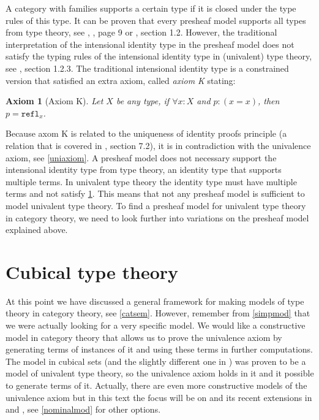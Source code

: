 \documentclass[12pt,a4paper,twoside,xetex]{book}
\newcommand{\keyword}[1]{\emph{#1}\index{#1}}
\newtheorem{axiom}[theorem]{Axiom}
\newcommand{\op}[1]{\mathtt{#1}}
\begin{document}
A category with families supports a certain type if it is closed under the type rules of this type.  It can be proven that every presheaf model supports all types from type theory, see \cite{Hofmann1997}, \cite{Nuyts2018}, page 9 or \cite{Huber2016}, section 1.2. However, the traditional interpretation of the intensional identity type in the presheaf model does not satisfy the typing rules of the intensional identity type in (univalent) type theory, see \cite{Huber2016}, section 1.2.3. The traditional intensional identity type is a constrained version that satisfied an extra axiom, called \keyword{axiom K} stating: 

\begin{axiom}[Axiom K]\label{axiomk}
Let $X$ be any type, if $\forall x : X$ and $p : (x = x)$, then $p = \op{refl}_x$.  
\end{axiom}

Because axom K is related to the uniqueness of identity proofs principle (a relation that is covered in \cite{Voevodsky2013}, section 7.2), it is in contradiction with the univalence axiom, see \cref{uniaxiom}. A presheaf model does not necessary support the intensional identity type from type theory, an identity type that supports multiple terms. In univalent type theory the identity type must have multiple terms and not satisfy \cref{axiomk}. This means that not any presheaf model is sufficient to model univalent type theory. To find a presheaf model for univalent type theory in category theory, we need to look further into variations on the presheaf model explained above.  

\chapter{Cubical type theory}\label{cubical}

At this point we have discussed a general framework for making models of type theory in category theory, see \cref{catsem}. However, remember from \cref{simpmod} that we were actually looking for a very specific model. We would like a constructive model in category theory that allows us to prove the univalence axiom by generating terms of instances of it and using these terms in further computations. The model in cubical sets \cite{Bezem2014} (and the slightly different one in \cite{Cohen2016}) was proven to be a model of univalent type theory, so the univalence axiom holds in it and it possible to generate terms of it. Actually, there are even more constructive models of the univalence axiom but in this text the focus will be on \cite{Cohen2016} and its recent extensions in \cite{Coquand2018} and \cite{Moertberg2018}, see \cref{nominalmod} for other options. 
\end{document}
